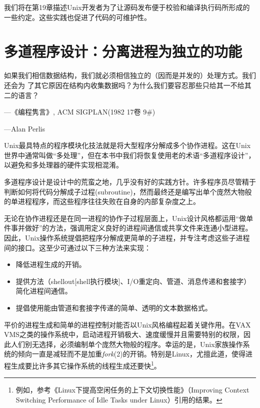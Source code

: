\documentclass[12pt,oneside]{book}
\begin{document}
\begin{common-format}
我们将在第19章描述Unix开发者为了让源码发布便于校验和编译执行码所形成的一些约定。这些实践也促进了代码的可维护性。


\chapter{多道程序设计：分离进程为独立的功能}
\begin{flushright}
\begin{notecard}{30em}
如果我们相信数据结构，我们就必须相信独立的（因而是并发的）处理方式。我们还会为
了其它原因在结构内收集数据吗？为什么我们要容忍那些只给其一不给其二的语言？

{\hfill —《编程隽言》, ACM SIGPLAN(1982 17卷 9\#{})}

{\hfill —Alan Perlis}
\end{notecard}
\end{flushright}

Unix最具特点的程序模块化技法就是将大型程序分解成多个协作进程。这在Unix世界中通常叫做“多处理”，但在本书中我们将恢复使用老的术语“多道程序设计”，以避免和多处理器的硬件实现相混淆。

多道程序设计是设计中的荒蛮之地，几乎没有好的实践方针。许多程序员尽管精于判断如何将代码分解成子过程(subroutine)，然而最终还是编写出单个庞然大物般的单进程程序，而这些程序往往失败在自身的内部复杂度之上。

无论在协作进程还是在同一进程的协作子过程层面上，Unix设计风格都运用“做单件事并做好”的方法，强调用定义良好的进程间通信或共享文件来连通小型进程。因此，Unix操作系统提倡把程序分解成更简单的子进程，并专注考虑这些子进程间的接口。这至少可通过以下三种方法来实现：
\begin{itemize}
\item 降低进程生成的开销。
\item 提供方法（shellout[shell执行模块]、I/O重定向、管道、消息传递和套接字）简化进程间通信。
\item 提倡使用能由管道和套接字传递的简单、透明的文本数据格式。
\end{itemize}

平价的进程生成和简单的进程控制对能否以Unix风格编程起着关键作用。在VAX VMS之类的操作系统中，启动进程开销极大、速度缓慢并且需要特别的权限，因此人们别无选择，必须编制单个庞然大物般的程序。幸运的是，Unix家族操作系统的倾向一直是减轻而不是加重\textit{fork}(2)的开销。特别是Linux，尤擅此道，使得进程生成要比许多其它操作系统的线程生成还要快\footnote{例如，参考《Linux下提高空闲任务的上下文切换性能》（Improving Context Switching Performance of Idle Tasks under Linux）\cite{Appleton}引用的结果。}。


\end{common-format}
\end{document}
